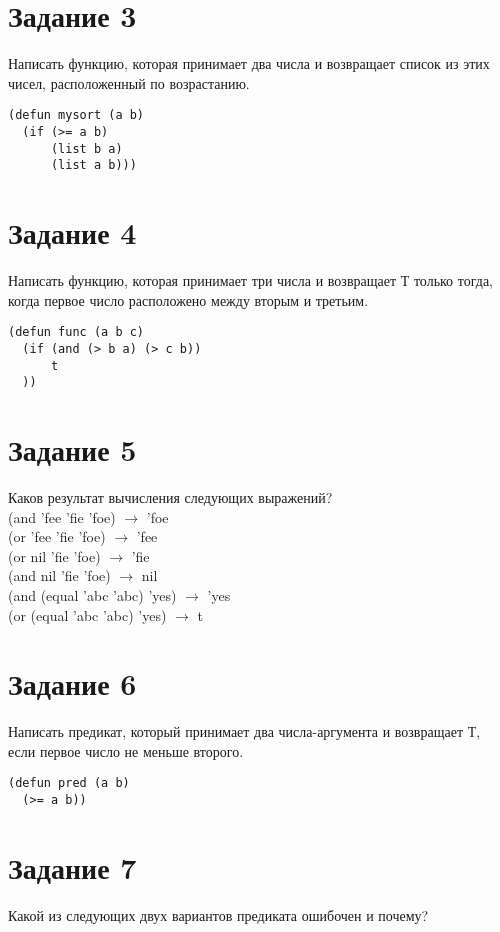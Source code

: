 \section{Задание 3}
Написать функцию, которая принимает два числа и возвращает
список из этих чисел, расположенный по возрастанию.\\

\begin{lstlisting}
(defun mysort (a b)
  (if (>= a b)
      (list b a)
      (list a b)))
\end{lstlisting}
\section{Задание 4}
Написать функцию, которая принимает три числа и возвращает Т только
тогда, когда первое число расположено между вторым и третьим.\\

\begin{lstlisting}
(defun func (a b c)
  (if (and (> b a) (> c b))
      t
  ))
\end{lstlisting}
\section{Задание 5}
Каков результат вычисления следующих выражений?\\

(and 'fee 'fie 'foe) $\rightarrow$ 'foe\\
(or 'fee 'fie 'foe) $\rightarrow$ 'fee\\
(or nil 'fie 'foe) $\rightarrow$ 'fie\\
(and nil 'fie 'foe) $\rightarrow$ nil\\
(and (equal 'abc 'abc) 'yes) $\rightarrow$ 'yes\\
(or (equal 'abc 'abc) 'yes) $\rightarrow$ t\\

\section{Задание 6}
Написать предикат, который принимает два числа-аргумента и возвращает
Т, если первое число не меньше второго.\\

\begin{lstlisting}
(defun pred (a b)
  (>= a b))
\end{lstlisting}
\section{Задание 7}
Какой из следующих двух вариантов предиката ошибочен и почему?\\

